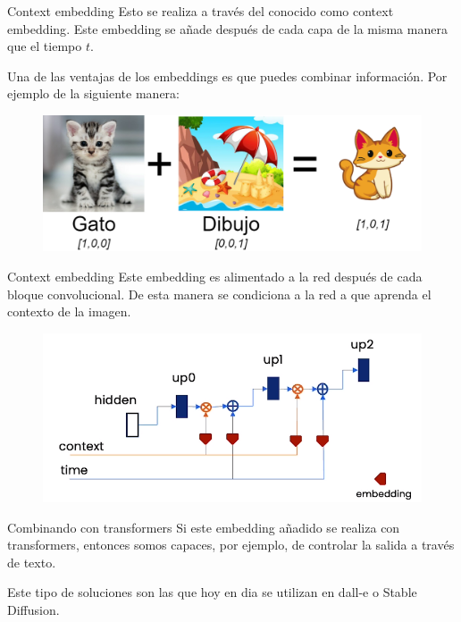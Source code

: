\begin{frame}{Context embedding}
Esto se realiza a través del conocido como \alert{context embedding}. Este embedding se añade después de cada capa de la misma manera que el \alert{tiempo $t$}.

Una de las ventajas de los embeddings es que puedes \alert{combinar información}. Por ejemplo de la siguiente manera:

\begin{figure}
    \centering
    \includegraphics[width=\textwidth]{Slides/figures/Diffusion_Models/Embedding_Combination.png}
\end{figure}
\end{frame}

\begin{frame}{Context embedding}
Este embedding es \alert{alimentado} a la red después de cada bloque convolucional. De esta manera se \alert{condiciona} a la red a que aprenda el contexto de la imagen.

\begin{figure}
    \centering
    \includegraphics[width=\textwidth]{Slides/figures/Diffusion_Models/Context_Embedding.png}
    \caption{\cite{DeepLearningDifussionModelCourse}}
\end{figure}
\end{frame}

\begin{frame}{Combinando con transformers}
Si este embedding añadido se realiza con \alert{transformers}, entonces somos capaces, por ejemplo, de controlar la salida a través de texto.

Este tipo de soluciones son las que hoy en dia se utilizan en \alert{dall-e} o \alert{Stable Diffusion}.
\end{frame}

